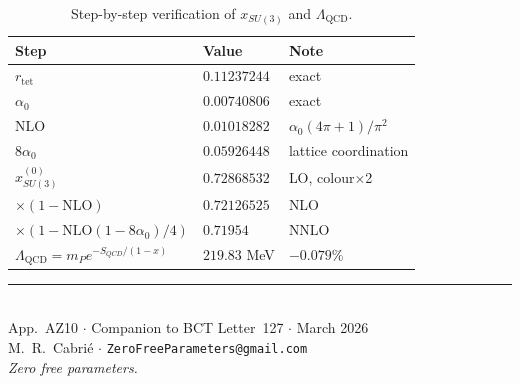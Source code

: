 \documentclass[aps,prl,twocolumn,showpacs,preprintnumbers]{revtex4-2}
\newcommand{\rtet}{r_{\mathrm{tet}}}
\newcommand{\azero}{\alpha_0}
\newcommand{\mP}{m_P}
\newcommand{\LQCD}{\Lambda_{\mathrm{QCD}}}
\newcommand{\NLO}{\mathrm{NLO}}
\begin{document}
\begin{table}[h]
\centering
\caption{Step-by-step verification of $x_{SU(3)}$ and $\LQCD$.}
\begin{tabular}{lll}
\toprule
Step & Value & Note \\
\midrule
$\rtet$ & $0.11237244$ & exact \\
$\azero$ & $0.00740806$ & exact \\
$\NLO$ & $0.01018282$ & $\azero(4\pi+1)/\pi^2$ \\
$8\azero$ & $0.05926448$ & lattice coordination \\
$x^{(0)}_{SU(3)}$ & $0.72868532$ & LO, colour$\times$2 \\
$\times(1-\NLO)$ & $0.72126525$ & NLO \\
$\times(1-\NLO(1-8\azero)/4)$ & $0.71954$ & NNLO \\
$\LQCD = \mP e^{-S_{QCD}/(1-x)}$ & $219.83$ MeV & \textbf{$-0.079\%$} \\
\bottomrule
\end{tabular}
\end{table}

\bigskip
\begin{center}
\rule{0.5\textwidth}{0.4pt}\\[4pt]
App.~AZ10 $\cdot$ Companion to BCT Letter~127 $\cdot$ March 2026\\
M.~R.~Cabri\'e $\cdot$ \texttt{ZeroFreeParameters@gmail.com}\\[2pt]
\textit{Zero free parameters.}
\end{center}
\end{document}
